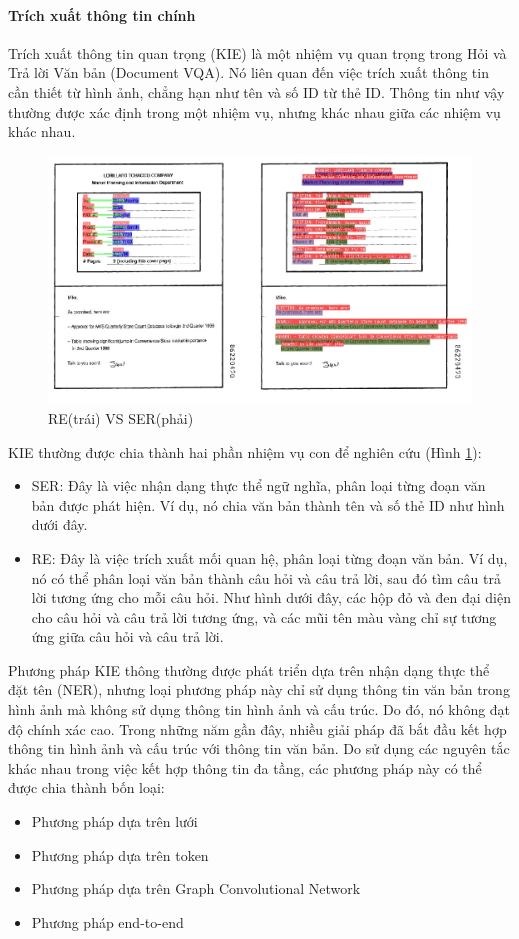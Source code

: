 \paragraph{Trích xuất thông tin chính}
Trích xuất thông tin quan trọng (KIE) là một nhiệm vụ quan trọng trong Hỏi và Trả lời Văn bản (Document VQA). Nó liên quan đến việc trích xuất thông tin cần thiết từ hình ảnh, chẳng hạn như tên và số ID từ thẻ ID. Thông tin như vậy thường được xác định trong một nhiệm vụ, nhưng khác nhau giữa các nhiệm vụ khác nhau.

\begin{figure}[h!]
    \includegraphics[scale=0.6]{images/re-vs-ser.png}
    \centering
    \caption{RE(trái) VS SER(phải)}
    \label{fig8:ser-re}
\end{figure}

KIE thường được chia thành hai phần nhiệm vụ con để nghiên cứu (Hình \ref{fig8:ser-re}):
\begin{itemize}
    \item SER: Đây là việc nhận dạng thực thể ngữ nghĩa, phân loại từng đoạn văn bản được phát hiện. Ví dụ, nó chia văn bản thành tên và số thẻ ID như hình dưới đây.
    \item RE: Đây là việc trích xuất mối quan hệ, phân loại từng đoạn văn bản. Ví dụ, nó có thể phân loại văn bản thành câu hỏi và câu trả lời, sau đó tìm câu trả lời tương ứng cho mỗi câu hỏi. Như hình dưới đây, các hộp đỏ và đen đại diện cho câu hỏi và câu trả lời tương ứng, và các mũi tên màu vàng chỉ sự tương ứng giữa câu hỏi và câu trả lời.
\end{itemize}
Phương pháp KIE thông thường được phát triển dựa trên nhận dạng thực thể đặt tên (NER), nhưng loại phương pháp này chỉ sử dụng thông tin văn bản trong hình ảnh mà không sử dụng thông tin hình ảnh và cấu trúc. Do đó, nó không đạt độ chính xác cao. Trong những năm gần đây, nhiều giải pháp đã bắt đầu kết hợp thông tin hình ảnh và cấu trúc với thông tin văn bản. Do sử dụng các nguyên tắc khác nhau trong việc kết hợp thông tin đa tầng, các phương pháp này có thể được chia thành bốn loại:
\begin{itemize}
    \item Phương pháp dựa trên lưới
    \item Phương pháp dựa trên token
    \item Phương pháp dựa trên Graph Convolutional Network
    \item Phương pháp end-to-end
\end{itemize}
